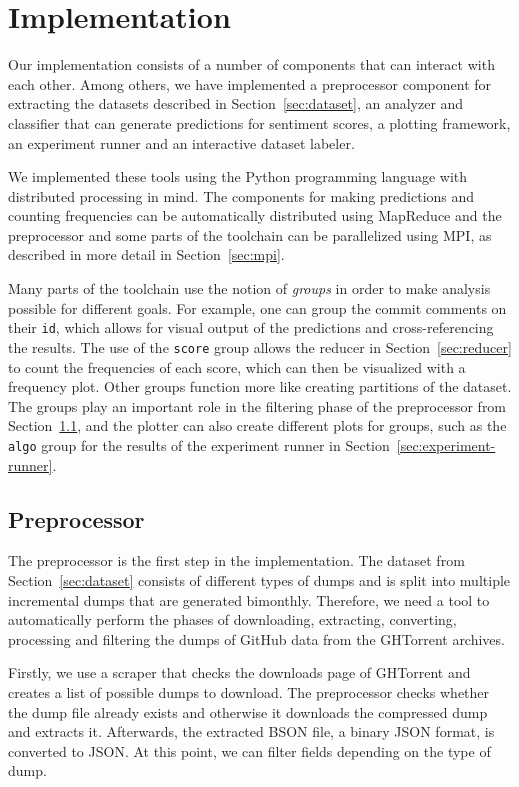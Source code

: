 \documentclass{article}
\begin{document}
\section{Implementation}\label{sec:implementation}
Our implementation consists of a number of components that can interact with 
each other. Among others, we have implemented a preprocessor component for 
extracting the datasets described in Section~\ref{sec:dataset}, an analyzer and 
classifier that can generate predictions for sentiment scores, a plotting 
framework, an experiment runner and an interactive dataset labeler.

We implemented these tools using the Python programming language with 
distributed processing in mind. The components for making predictions and 
counting frequencies can be automatically distributed using MapReduce and the 
preprocessor and some parts of the toolchain can be parallelized using MPI, as 
described in more detail in Section~\ref{sec:mpi}.

Many parts of the toolchain use the notion of \emph{groups} in order to make 
analysis possible for different goals. For example, one can group the commit 
comments on their {\tt id}, which allows for visual output of the predictions 
and cross-referencing the results. The use of the {\tt score} group allows the 
reducer in Section~\ref{sec:reducer} to count the frequencies of each score, 
which can then be visualized with a frequency plot. Other groups function more 
like creating partitions of the dataset. The groups play an important role in
the filtering phase of the preprocessor from Section~\ref{sec:preprocessor},
and the plotter can also create different plots for groups, such as the
{\tt algo} group for the results of the experiment runner in
Section~\ref{sec:experiment-runner}.

\subsection{Preprocessor}\label{sec:preprocessor}
The preprocessor is the first step in the implementation. The dataset from 
Section~\ref{sec:dataset} consists of different types of dumps and is split 
into multiple incremental dumps that are generated bimonthly. Therefore, we 
need a tool to automatically perform the phases of downloading, extracting, 
converting, processing and filtering the dumps of GitHub data from the 
GHTorrent archives.

Firstly, we use a scraper that checks the downloads page of GHTorrent and 
creates a list of possible dumps to download. The preprocessor checks whether 
the dump file already exists and otherwise it downloads the compressed dump and 
extracts it. Afterwards, the extracted BSON file, a binary JSON format, is 
converted to JSON\@. At this point, we can filter fields depending on the 
type of dump.
\end{document}
